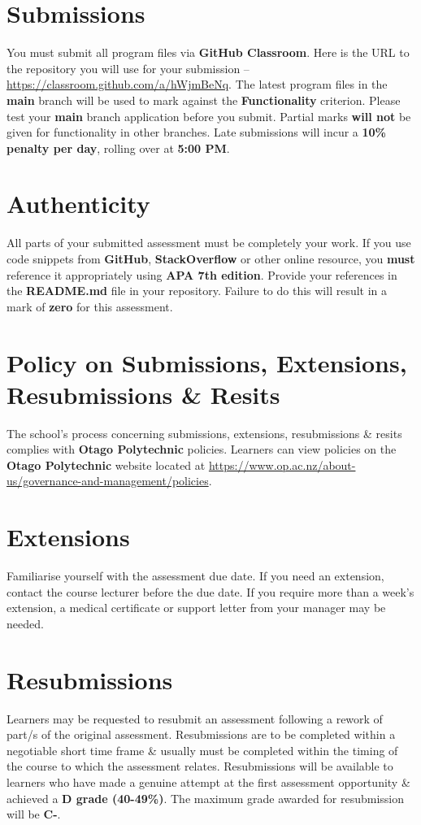 \documentclass{article}
\begin{document}
\section*{Submissions}
You must submit all program files via \textbf{GitHub Classroom}. Here is the URL to the repository you will use for your submission – \href{https://classroom.github.com/a/hWjmBeNq}{https://classroom.github.com/a/hWjmBeNq}. The latest program files in the \textbf{main} branch will be used to mark against the \textbf{Functionality} criterion. Please test your \textbf{main} branch application before you submit. Partial marks \textbf{will not} be given for functionality in other branches. Late submissions will incur a \textbf{10\% penalty per day}, rolling over at \textbf{5:00 PM}.

\section*{Authenticity}
All parts of your submitted assessment must be completely your work. If you use code snippets from \textbf{GitHub}, \textbf{StackOverflow} or other online resource, you \textbf{must} reference it appropriately using \textbf{APA 7th edition}. Provide your references in the \textbf{README.md} file in your repository. Failure to do this will result in a mark of \textbf{zero} for this assessment.

\section*{Policy on Submissions, Extensions, Resubmissions \& Resits}
The school's process concerning submissions, extensions, resubmissions \& resits complies with \textbf{Otago Polytechnic} policies. Learners can view policies on the \textbf{Otago Polytechnic} website located at \href{https://www.op.ac.nz/about-us/governance-and-management/policies}{https://www.op.ac.nz/about-us/governance-and-management/policies}.

\section*{Extensions}
Familiarise yourself with the assessment due date. If you need an extension, contact the course lecturer before the due date. If you require more than a week's extension, a medical certificate or support letter from your manager may be needed.

\section*{Resubmissions}
Learners may be requested to resubmit an assessment following a rework of part/s of the original assessment. Resubmissions are to be completed within a negotiable short time frame \& usually must be completed within the timing of the course to which the assessment relates. Resubmissions will be available to learners who have made a genuine attempt at the first assessment opportunity \& achieved a \textbf{D grade (40-49\%)}. The maximum grade awarded for resubmission will be \textbf{C-}.
\end{document}
